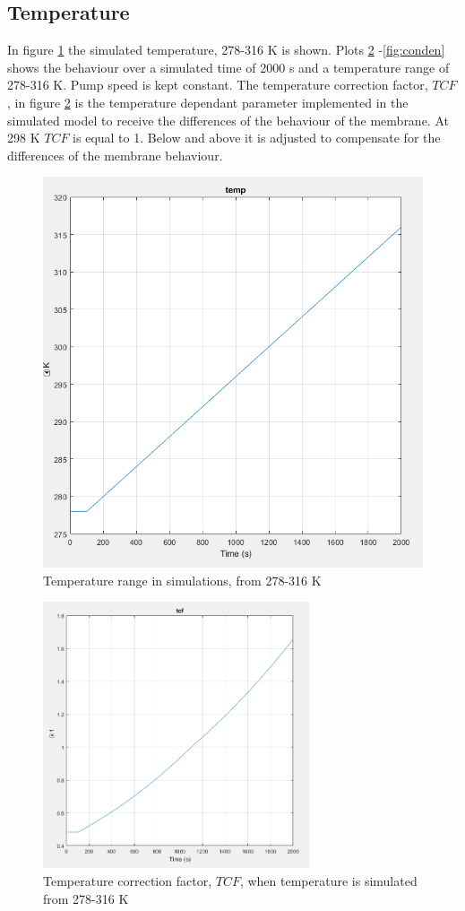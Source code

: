 \subsection{Temperature}
In figure \ref{fig:temp} the simulated temperature, 278-316 K is shown. Plots \ref{fig:tcf} -\ref{fig:conden} shows the behaviour over a simulated time of 2000 s and a temperature range of 278-316 K. Pump speed is kept constant. The temperature correction factor, $TCF$, in figure \ref{fig:tcf} is the temperature dependant parameter implemented in the simulated model to receive the differences of the behaviour of the membrane. At 298 K $TCF$ is equal to 1. Below and above it is adjusted to compensate for the differences of the membrane behaviour. 
\begin{figure}[h]
  \centering
  \includegraphics[width=0.7\linewidth]{temp.PNG}
  \caption{Temperature range in simulations, from 278-316 K}
  \label{fig:temp}
\end{figure}

\begin{figure}[h]
\centering
    \centering
    \includegraphics[width=0.7\textwidth]{tcf.PNG}
    \caption{Temperature correction factor, $TCF$, when temperature is simulated from 278-316 K}
    \label{fig:tcf}
\end{figure}
\newpage

